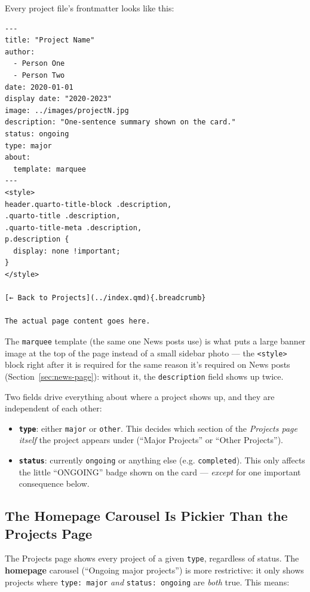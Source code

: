 \documentclass[11pt]{article}
\newcommand{\term}[1]{\textbf{#1}}
\newcommand{\file}[1]{\texttt{#1}}
\newcommand{\cmd}[1]{\texttt{#1}}
\begin{document}
Every project file's frontmatter looks like this:

\begin{lstlisting}
---
title: "Project Name"
author:
  - Person One
  - Person Two
date: 2020-01-01
display date: "2020-2023"
image: ../images/projectN.jpg
description: "One-sentence summary shown on the card."
status: ongoing
type: major
about:
  template: marquee
---
<style>
header.quarto-title-block .description,
.quarto-title .description,
.quarto-title-meta .description,
p.description {
  display: none !important;
}
</style>

[← Back to Projects](../index.qmd){.breadcrumb}

The actual page content goes here.
\end{lstlisting}

The \file{marquee} template (the same one News posts use) is what puts
a large banner image at the top of the page instead of a small sidebar
photo --- the \cmd{<style>} block right after it is required for the
same reason it's required on News posts (Section~\ref{sec:news-page}):
without it, the \file{description} field shows up twice.

Two fields drive everything about where a project shows up, and they
are independent of each other:

\begin{itemize}
    \item \term{\file{type}}: either \cmd{major} or \cmd{other}. This
    decides which section of the \emph{Projects page itself} the
    project appears under (``Major Projects'' or ``Other Projects'').
    \item \term{\file{status}}: currently \cmd{ongoing} or anything
    else (e.g. \cmd{completed}). This only affects the little
    ``ONGOING'' badge shown on the card --- \emph{except} for one
    important consequence below.
\end{itemize}

\subsection{The Homepage Carousel Is Pickier Than the Projects Page}

The Projects page shows every project of a given \file{type}, regardless
of status. The \term{homepage} carousel (``Ongoing major projects'') is
more restrictive: it only shows projects where \file{type: major}
\emph{and} \file{status: ongoing} are \emph{both} true. This means:
\end{document}
